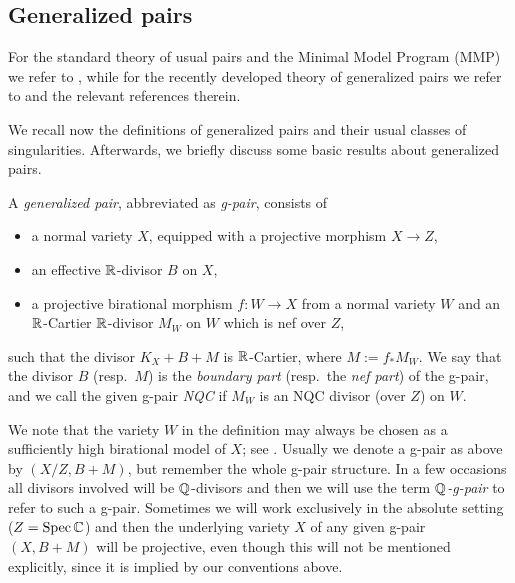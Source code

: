 	
	\subsection{Generalized pairs}
	\label{subsection:g-pairs}
	
	For the standard theory of usual pairs and the Minimal Model Program (MMP) we refer to \cite{KM98,Fuj17}, while for the recently developed theory of generalized pairs we refer to \cite{BZ16,HaconLiu21,LT22a,LT22b,LX22a,LX22b,Xie22} and the relevant references therein. 
	
	We recall now the definitions of generalized pairs and their usual classes of singularities. Afterwards, we briefly discuss some basic results about generalized pairs.
	
	\begin{dfn}
		A \emph{generalized pair}, abbreviated as \emph{g-pair}, consists of 
		\begin{itemize}
			\item a normal variety $ X $, equipped with a projective morphism $ X \to Z $,
			
			\item an effective $ \mathbb{R} $-divisor $ B $ on $X$,
			
			\item a projective birational morphism $ f \colon W \to X $ from a normal variety $ W $ and an $\mathbb{R}$-Cartier $\mathbb{R}$-divisor $ M_W $ on $ W $ which is nef over $ Z $,
		\end{itemize}
		such that the divisor $ K_X + B + M $ is $ \mathbb{R} $-Cartier, where $ M := f_* M_W $. 
		We say that the divisor $ B $ (resp.\ $ M $) is the \emph{boundary part} (resp.\ the \emph{nef part}) of the g-pair, and we call the given g-pair \emph{NQC} if $M_W$ is an NQC divisor (over $ Z $) on $ W $.
	\end{dfn}
	
	We note that the variety $ W $ in the definition may always be chosen as a sufficiently high birational model of $ X $; see \cite[Definition 1.4]{BZ16}. Usually we denote a g-pair as above by $(X/Z,B+M)$, but remember the whole g-pair structure. In a few occasions all divisors involved will be $\mathbb{Q}$-divisors and then we will use the term \emph{$\mathbb{Q}$-g-pair} to refer to such a g-pair. Sometimes we will work exclusively in the absolute setting ($Z = \operatorname{Spec} \mathbb{C}$) and then the underlying variety $X$ of any given g-pair $(X,B+M)$ will be projective, even though this will not be mentioned explicitly, since it is implied by our conventions above.
	
